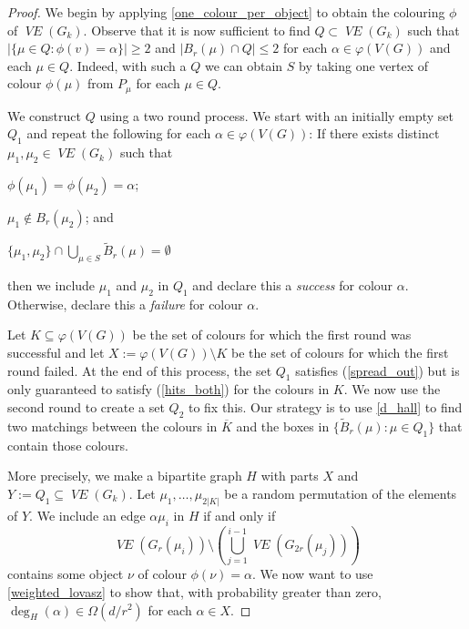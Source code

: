 \documentclass{patmorin}
\newcommand{\defin}[1]{\emph{\color{brown}#1}}
\DeclareMathOperator{\VE}{\mathit{VE}}
\begin{document}
\begin{proof}
  We begin by applying \cref{one_colour_per_object} to obtain the colouring $\phi$ of $\VE(G_k)$.  Observe that it is now sufficient to find $Q\subset\VE(G_k)$ such that $|\{\mu\in Q:\phi(v)=\alpha\}|\ge 2$ and $|B_r(\mu)\cap Q|\le 2$ for each $\alpha\in\varphi(V(G))$ and each $\mu\in Q$.  Indeed, with such a $Q$ we can obtain $S$ by taking one vertex of colour $\phi(\mu)$ from $P_\mu$ for each $\mu\in Q$.

  We construct $Q$ using a two round process.  We start with an initially empty set $Q_1$ and repeat the following for each $\alpha\in\varphi(V(G))$:
  If there exists distinct $\mu_1,\mu_2\in\VE(G_k)$ such that
  \begin{compactenum}[(a)]
    \item $\phi(\mu_1)=\phi(\mu_2)=\alpha$;
    \item $\mu_1\not\in B_r(\mu_2)$; and
    \item $\{\mu_1,\mu_2\}\cap \bigcup_{\mu\in S} \tilde{B}_{r}(\mu)=\emptyset$
  \end{compactenum}
  then we include $\mu_1$ and $\mu_2$ in $Q_1$ and declare this a \defin{success} for colour $\alpha$.  Otherwise, declare this a \defin{failure} for colour $\alpha$.

  Let $K\subseteq\varphi(V(G))$ be the set of colours for which the first round was successful and let $X:=\varphi(V(G))\setminus K$ be the set of colours for which the first round failed.  At the end of this process, the set $Q_1$ satisfies (\ref{spread_out}) but is only guaranteed to satisfy (\ref{hits_both}) for the colours in $K$.  We now use the second round to create a set $Q_2$ to fix this. Our strategy is to use \cref{d_hall} to find two matchings between the colours in $\overline{K}$ and the boxes in $\{\tilde{B}_r(\mu):\mu\in Q_1\}$ that contain those colours.

  More precisely, we make a bipartite graph $H$ with parts $X$ and $Y:=Q_1\subseteq\VE(G_k)$.  Let $\mu_1,\ldots,\mu_{2|K|}$ be a random permutation of the elements of $Y$.  We include an edge $\alpha\mu_i$ in $H$ if and only if
  \[
    \VE(G_r(\mu_i))\setminus\left(\bigcup_{j=1}^{i-1}\VE(G_{2r}(\mu_j))\right)
  \]
  contains some object $\nu$ of colour $\phi(\nu)=\alpha$.  We now want to use \cref{weighted_lovasz} to show that, with probability greater than zero, $\deg_H(\alpha)\in \Omega(d/r^2)$ for each $\alpha\in X$.



\end{proof}
\end{document}
